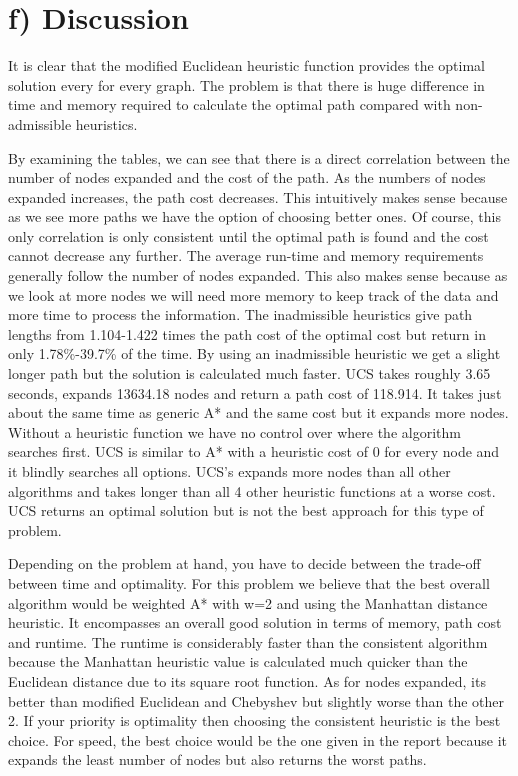 \documentclass[a4paper]{article}
\begin{document}
\section*{f) Discussion}
It is clear that the modified Euclidean heuristic function provides the optimal solution every for every graph. The problem is that there is huge difference in time and memory required to calculate the optimal path compared with non-admissible heuristics.

By examining the tables, we can see that there is a direct correlation between the number of nodes expanded and the cost of the path. As the numbers of nodes expanded increases, the path cost decreases. This intuitively makes sense because as we see more paths we have the option of choosing better ones. Of course, this only correlation is only consistent until the optimal path is found and the cost cannot decrease any further. The average run-time and memory requirements generally follow the number of nodes expanded. This also makes sense because as we look at more nodes we will need more memory to keep track of the data and more time to process the information. The inadmissible heuristics give path lengths from 1.104-1.422 times the path cost of the optimal cost but return in only 1.78\%-39.7\% of the time. By using an inadmissible heuristic we get a slight longer path but the solution is calculated much faster. UCS takes roughly 3.65 seconds, expands 13634.18 nodes and return a path cost of 118.914. It takes just about the same time as generic A* and the same cost but it expands more nodes. Without a heuristic function we have no control over where the algorithm searches first. UCS is similar to A* with a heuristic cost of 0 for every node and it blindly searches all options. UCS's expands more nodes than all other algorithms and takes longer than all 4 other heuristic functions at a worse cost. UCS returns an optimal solution but is not the best approach for this type of problem.

Depending on the problem at hand, you have to decide between the trade-off between time and optimality. For this problem we believe that the best overall algorithm would be weighted A* with w=2 and using the Manhattan distance heuristic. It encompasses an overall good solution in terms of memory, path cost and runtime. The runtime is considerably faster than the consistent algorithm because the Manhattan heuristic value is calculated much quicker than the Euclidean distance due to its square root function. As for nodes expanded, its better than modified Euclidean and Chebyshev but slightly worse than the other 2. If your priority is optimality then choosing the consistent heuristic is the best choice. For speed, the best choice would be the one given in the report because it expands the least number of nodes but also returns the worst paths.
\end{document}
